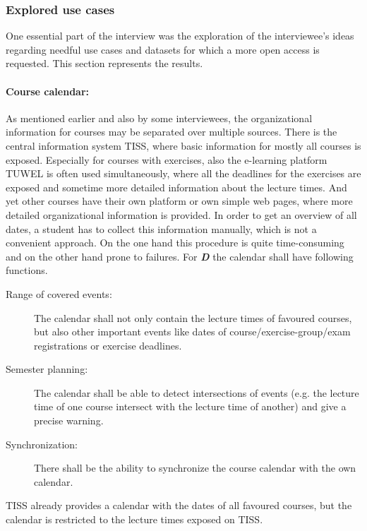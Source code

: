 \documentclass{article}
\begin{document}
\subsubsection{Explored use cases}
\label{lod-benefits-challenges:explored-needs-usecases:explored}
One essential part of the interview was the exploration of the interviewee's ideas regarding needful use cases and datasets for which a more open access is requested. This section represents the results.

\paragraph{Course calendar:} As mentioned earlier and also by some interviewees, the organizational information for courses may be separated over multiple sources. There is the central information system TISS, where basic information for mostly all courses is exposed. Especially for courses with exercises, also the e-learning platform TUWEL is often used simultaneously, where all the deadlines for the exercises are exposed and sometime more detailed information about the lecture times. And yet other courses have their own platform or own simple web pages, where more detailed organizational information is provided. In order to get an overview of all dates, a student has to collect this information manually, which is not a convenient approach. On the one hand this procedure is quite time-consuming and on the other hand prone to failures. For \textit{\textbf{D}} the calendar shall have following functions.

\begin{description}
 \item[Range of covered events:] The calendar shall not only contain the lecture times of favoured courses, but also other important events like dates of course/exercise-group/exam registrations or exercise deadlines.
 \item[Semester planning:] The calendar shall be able to detect intersections of events (e.g. the lecture time of one course intersect with the lecture time of another) and give a precise warning. 
 \item[Synchronization:] There shall be the ability to synchronize the course calendar with the own calendar.
\end{description} 

TISS already provides a calendar with the dates of all favoured courses, but the calendar is restricted to the lecture times exposed on TISS.
\end{document}
